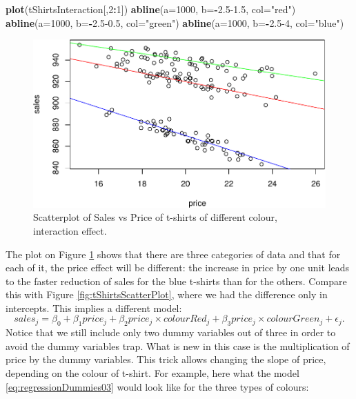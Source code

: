 \documentclass[
]{book}
\newenvironment{Shaded}{\begin{snugshade}}{\end{snugshade}}
\newcommand{\AttributeTok}[1]{\textcolor[rgb]{0.13,0.29,0.53}{#1}}
\newcommand{\DecValTok}[1]{\textcolor[rgb]{0.00,0.00,0.81}{#1}}
\newcommand{\FloatTok}[1]{\textcolor[rgb]{0.00,0.00,0.81}{#1}}
\newcommand{\FunctionTok}[1]{\textcolor[rgb]{0.13,0.29,0.53}{\textbf{#1}}}
\newcommand{\NormalTok}[1]{#1}
\newcommand{\SpecialCharTok}[1]{\textcolor[rgb]{0.81,0.36,0.00}{\textbf{#1}}}
\newcommand{\StringTok}[1]{\textcolor[rgb]{0.31,0.60,0.02}{#1}}
\theoremstyle{definition}
\theoremstyle{definition}
\theoremstyle{definition}
\theoremstyle{definition}
\theoremstyle{remark}
\begin{document}
\begin{Shaded}
\begin{Highlighting}[]
\FunctionTok{plot}\NormalTok{(tShirtsInteraction[,}\DecValTok{2}\SpecialCharTok{:}\DecValTok{1}\NormalTok{])}
\FunctionTok{abline}\NormalTok{(}\AttributeTok{a=}\DecValTok{1000}\NormalTok{, }\AttributeTok{b=}\SpecialCharTok{{-}}\FloatTok{2.5{-}1.5}\NormalTok{, }\AttributeTok{col=}\StringTok{"red"}\NormalTok{)}
\FunctionTok{abline}\NormalTok{(}\AttributeTok{a=}\DecValTok{1000}\NormalTok{, }\AttributeTok{b=}\SpecialCharTok{{-}}\FloatTok{2.5{-}0.5}\NormalTok{, }\AttributeTok{col=}\StringTok{"green"}\NormalTok{)}
\FunctionTok{abline}\NormalTok{(}\AttributeTok{a=}\DecValTok{1000}\NormalTok{, }\AttributeTok{b=}\SpecialCharTok{{-}}\FloatTok{2.5}\DecValTok{{-}4}\NormalTok{, }\AttributeTok{col=}\StringTok{"blue"}\NormalTok{)}
\end{Highlighting}
\end{Shaded}

\begin{figure}
\centering
\includegraphics{Svetunkov---Statistics-for-Business-Analytics_files/figure-latex/tShirtsInteractionScatterPlot-1.pdf}
\caption{\label{fig:tShirtsInteractionScatterPlot}Scatterplot of Sales vs Price of t-shirts of different colour, interaction effect.}
\end{figure}

The plot on Figure \ref{fig:tShirtsInteractionScatterPlot} shows that there are three categories of data and that for each of it, the price effect will be different: the increase in price by one unit leads to the faster reduction of sales for the blue t-shirts than for the others. Compare this with Figure \ref{fig:tShirtsScatterPlot}, where we had the difference only in intercepts. This implies a different model:
\begin{equation}
    sales_j = \beta_0 + \beta_1 price_j + \beta_2 price_j \times colourRed_j + \beta_3 price_j \times colourGreen_j + \epsilon_j .
    \label{eq:regressionDummies03}
\end{equation}
Notice that we still include only two dummy variables out of three in order to avoid the dummy variables trap. What is new in this case is the multiplication of price by the dummy variables. This trick allows changing the slope of price, depending on the colour of t-shirt. For example, here what the model \eqref{eq:regressionDummies03} would look like for the three types of colours:
\end{document}
